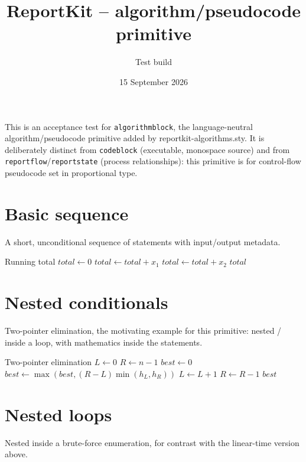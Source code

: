 \documentclass{reportkit}
\title{ReportKit -- algorithm/pseudocode primitive}
\author{Test build}
\date{15 September 2026}
\begin{document}
\maketitle

\begin{execsummary}
This is an acceptance test for \texttt{algorithmblock}, the language-neutral
algorithm/pseudocode primitive added by reportkit-algorithms.sty. It is
deliberately distinct from \texttt{codeblock} (executable, monospace source)
and from \texttt{reportflow}/\texttt{reportstate} (process relationships):
this primitive is for control-flow pseudocode set in proportional type.
\end{execsummary}

\section{Basic sequence}
A short, unconditional sequence of statements with input/output metadata.

\begin{algorithmblock}[label={alg:sequence}]{Running total}
  \State $total \gets 0$
  \State $total \gets total + x_1$
  \State $total \gets total + x_2$
  \State \Return $total$
\end{algorithmblock}

\section{Nested conditionals}
Two-pointer elimination, the motivating example for this primitive: nested
\texttt{\string\If}/\texttt{\string\Else} inside a \texttt{\string\While}
loop, with mathematics inside the statements.

\begin{algorithmblock}[label={alg:twopointer},caption={Two-pointer elimination finds the maximum container area in linear time.}]{Two-pointer elimination}
  \State $L \gets 0$
  \State $R \gets n-1$
  \State $best \gets 0$
    \State $best \gets \max(best,(R-L)\min(h_L,h_R))$
      \State $L \gets L+1$
    \Else
      \State $R \gets R-1$
    \EndIf
  \EndWhile
  \State \Return $best$
\end{algorithmblock}

\section{Nested loops}
Nested \texttt{\string\For} inside a brute-force enumeration, for contrast
with the linear-time version above.
\end{document}
